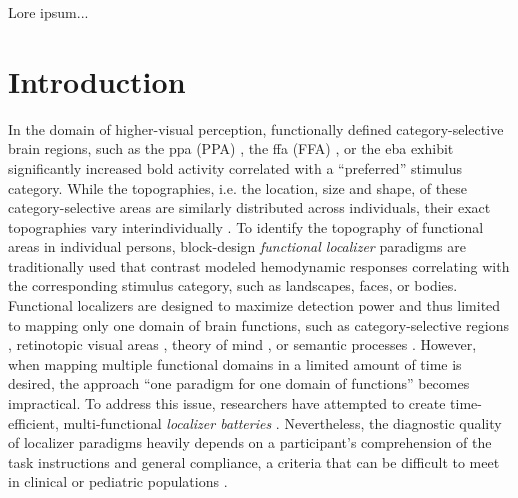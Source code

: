 
\begin{chapterabstract}

Lore ipsum...






\end{chapterabstract}



\pagebreak



\section{Introduction}

In the domain of higher-visual perception, functionally defined
category-selective brain regions, such as the \acl{ppa} (PPA)
\citep{epstein1998ppa}, the \acl{ffa} (FFA) \citep{kanwisher1997ffa}, or the
\ac{eba} \citep{downing2001bodyarea} exhibit significantly increased \acf{bold}
activity correlated with a ``preferred'' \citep[][p.
123]{debeck2008interpreting} stimulus category.
%
While the topographies, i.e. the location, size and shape, of these
category-selective areas are similarly distributed across individuals, their
exact topographies vary interindividually \citep{rosenke2021probabilistic,
zhen2017quantifying, zhen2015quantifying, frost2012measuring}.
To identify the topography of functional areas in individual persons,
block-design \textit{functional localizer} paradigms are traditionally used that
contrast modeled hemodynamic responses correlating with the corresponding
stimulus category, such as landscapes, faces, or bodies.
Functional localizers are designed to maximize detection power and thus limited
to mapping only one domain of brain functions, such as category-selective
regions \citep{stigliani2015temporal}, retinotopic visual areas
\citep{wang2015probabilistic}, theory of mind \citep{spunt2014validating}, or
semantic processes \citep{fedorenko2010new, fernandez2001language}.
However, when mapping multiple functional domains in a limited amount of time is
desired, the approach ``one paradigm for one domain of functions'' becomes
impractical.
To address this issue, researchers have attempted to create time-efficient,
multi-functional \textit{localizer batteries} \citep[e.g.,][]{barch2013function,
drobyshevsky2006rapid, pinel2007fast}.
Nevertheless, the diagnostic quality of localizer paradigms heavily depends on a
participant's comprehension of the task instructions and general compliance, a
criteria that can be difficult to meet in clinical or pediatric populations
\citep{eickhoff2020towards, vanderwal2019movies}.

